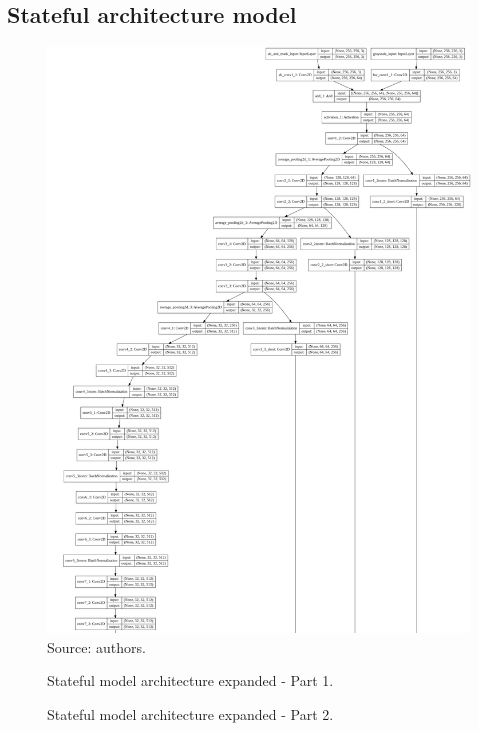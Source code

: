 \documentclass[12pt,openright,oneside,a4paper,english, brazilian]{abntex2}
\begin{document}
\begin{otherlanguage}{english}
\begin{apendicesenv}
\chapter{Stateful architecture model}
\clearpage
\newpage
\begin{figure}[!htb]
\centering
\caption{Stateful model architecture expanded - Part 1.}
\includegraphics[width=\textwidth,height=\textheight,keepaspectratio]{model_plot/Stateful1}
Source: authors.
\label{stateful_plot_1}
\end{figure}
\clearpage
\newpage
\begin{figure}[!htb]
\centering
\caption{Stateful model architecture expanded - Part 2.}

\end{figure}
\end{apendicesenv}
\end{otherlanguage}
\end{document}
